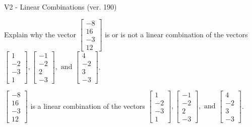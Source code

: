 \begin{exercise}
  \begin{exerciseTitle}V2 - Linear Combinations (ver. 190)\end{exerciseTitle}
  \begin{exerciseStatement}
    Explain why the vector \(\left[\begin{array}{c}
-8 \\
16 \\
-3 \\
12
\end{array}\right]\)  is or is not a linear 
	combination of the vectors \(\left[\begin{array}{c}
1 \\
-2 \\
-3 \\
1
\end{array}\right] , \left[\begin{array}{c}
-1 \\
-2 \\
2 \\
-3
\end{array}\right] , \text{ and } \left[\begin{array}{c}
4 \\
-2 \\
3 \\
-3
\end{array}\right]\).
	


  \end{exerciseStatement}
  \begin{exerciseAnswer}
   \(\left[\begin{array}{c}
-8 \\
16 \\
-3 \\
12
\end{array}\right]\) 
  	 is  
	a linear combination of the vectors \(\left[\begin{array}{c}
1 \\
-2 \\
-3 \\
1
\end{array}\right] , \left[\begin{array}{c}
-1 \\
-2 \\
2 \\
-3
\end{array}\right] , \text{ and } \left[\begin{array}{c}
4 \\
-2 \\
3 \\
-3
\end{array}\right]\).

	
  


  \end{exerciseAnswer}
\end{exercise}